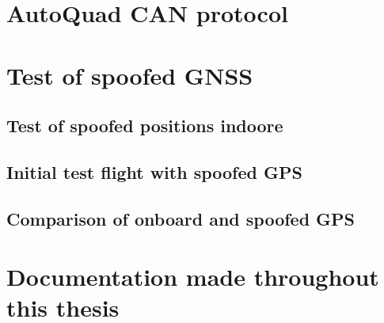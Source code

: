 \section{AutoQuad CAN protocol} \label{app:aq_can_protocol}

\newpage


\section{Test of spoofed GNSS}


\subsection{Test of spoofed positions indoore}
\label{sec:test_of_spoofed_positions_indoore}



\subsection{Initial test flight with spoofed GPS}
\label{sec:test_of_spoofed_positions_outdoore}


\subsection{Comparison of onboard and spoofed GPS}
\label{sec:test_of_spoofed_positions_outdoore}


\section{Documentation made throughout this thesis}

